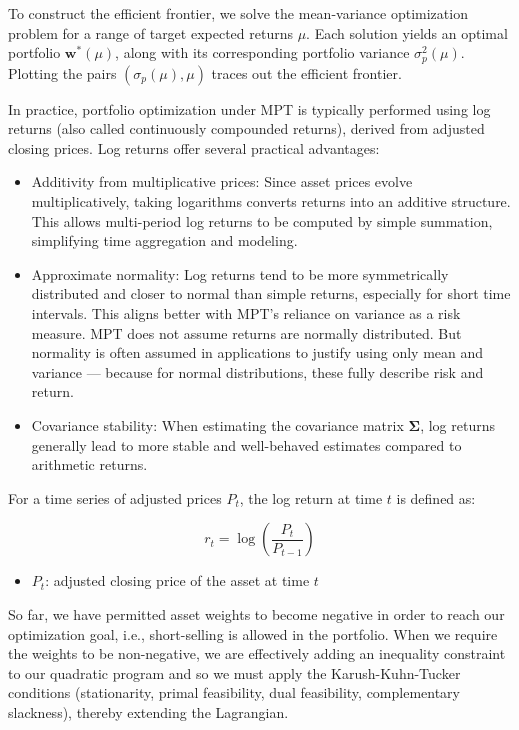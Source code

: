 To construct the efficient frontier, we solve the mean-variance optimization problem for a range of target expected returns \( \mu \). Each solution yields an optimal portfolio \( \mathbf{w}^*(\mu) \), along with its corresponding portfolio variance \( \sigma_p^2(\mu) \). Plotting the pairs \( (\sigma_p(\mu), \mu) \) traces out the efficient frontier.

In practice, portfolio optimization under MPT is typically performed using log returns (also called continuously compounded returns), derived from adjusted closing prices. Log returns offer several practical advantages:

\begin{itemize}
  \item[] Additivity from multiplicative prices: Since asset prices evolve multiplicatively, taking logarithms converts returns into an additive structure. This allows multi-period log returns to be computed by simple summation, simplifying time aggregation and modeling.
  \item[] Approximate normality: Log returns tend to be more symmetrically distributed and closer to normal than simple returns, especially for short time intervals. This aligns better with MPT's reliance on variance as a risk measure. MPT does not assume returns are normally distributed. But normality is often assumed in applications to justify using only mean and variance — because for normal distributions, these fully describe risk and return.
  \item[] Covariance stability: When estimating the covariance matrix \( \boldsymbol{\Sigma} \), log returns generally lead to more stable and well-behaved estimates compared to arithmetic returns.
\end{itemize}

For a time series of adjusted prices \( P_t \), the log return at time \( t \) is defined as:

\[
r_t = \log\left(\frac{P_t}{P_{t-1}}\right)
\]

\begin{itemize}
  \item[] \( P_t \): adjusted closing price of the asset at time \( t \)
\end{itemize}

\vspace{0.27cm} So far, we have permitted asset weights to become negative in order to reach our optimization goal, i.e., short-selling is allowed in the portfolio. When we require the weights to be non-negative, we are effectively adding an inequality constraint to our quadratic program and so we must apply the Karush-Kuhn-Tucker conditions (stationarity, primal feasibility, dual feasibility, complementary slackness), thereby extending the Lagrangian. 

